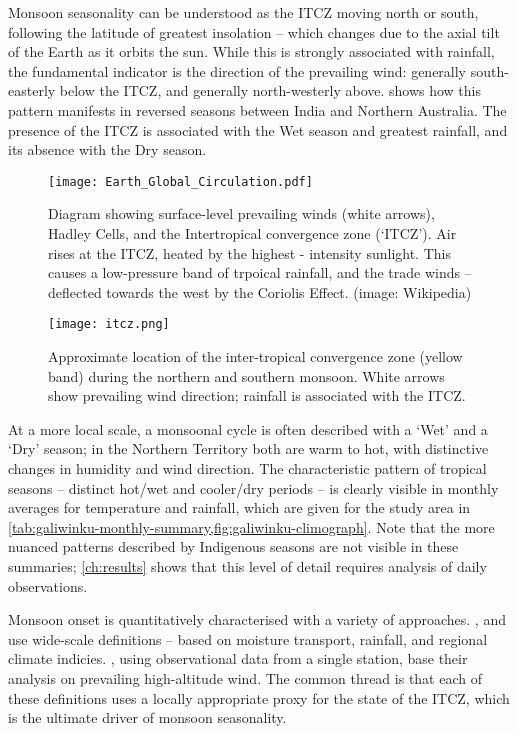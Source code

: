 Monsoon seasonality can be understood as the ITCZ moving north or south,
following the latitude of greatest insolation -- which changes due to the
axial tilt of the Earth as it orbits the sun.  While this is strongly
associated with rainfall, the fundamental indicator is the direction of
the prevailing wind: generally south-easterly below the ITCZ, and generally
north-westerly above.   shows how this pattern
manifests in reversed seasons between India and Northern Australia.
The presence of the ITCZ is associated with the Wet season and greatest
rainfall, and its absence with the Dry season.

\begin{figure}[p]
    \centering
    \texttt{[image: Earth\_Global\_Circulation.pdf]}
    \caption[Hadley Cells and trade-winds]{
        Diagram showing surface-level prevailing winds (white arrows),
        Hadley Cells, and the Intertropical convergence zone (`ITCZ').
        Air rises at the ITCZ, heated by the highest - intensity sunlight.
        This causes a low-pressure band of trpoical rainfall, and the
        trade winds -- deflected towards the west by the Coriolis Effect.
        (image: Wikipedia)}
    \label{fig:hadley-cells}
\vspace{1cm}
    \texttt{[image: itcz.png]}
    \caption[ITCZ showing northern and southern monsoon]{
        Approximate location of the inter-tropical convergence zone
        (yellow band) during the northern and southern monsoon.
        White arrows show prevailing wind direction; rainfall is
        associated with the ITCZ.  \citep[image:][]{boos2014}}
    \label{fig:itcz-india-aus}
\end{figure}

At a more local scale, a monsoonal cycle is often described with a `Wet' and a
`Dry' season; in the Northern Territory both are warm to hot, with distinctive
changes in humidity and wind direction.  The characteristic pattern of tropical
seasons -- distinct hot/wet and cooler/dry periods -- is clearly visible in
monthly averages for temperature and rainfall, which are given for the study
area in \cref{tab:galiwinku-monthly-summary,fig:galiwinku-climograph}.
Note that the more nuanced patterns described by Indigenous seasons are not
visible in these summaries; \cref{ch:results} shows that this level of detail
requires analysis of daily observations.


Monsoon onset is quantitatively characterised with a variety of approaches.
\citet{sultan2003,fasullo2002}, and \citet{wu1998} use wide-scale definitions
-- based on moisture transport, rainfall, and regional climate indicies.
\citet{hendon1990}, using observational data from a single station, base their
analysis on prevailing high-altitude wind.  The common thread is that each of
these definitions uses a locally appropriate proxy for the state of the ITCZ,
which is the ultimate driver of monsoon seasonality.

